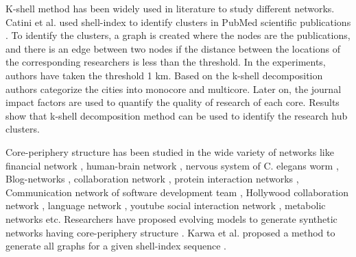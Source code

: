 \documentclass[12pt,3p]{article}
\begin{document}
 





K-shell method has been widely used in literature to study different networks. 
Catini et al. used shell-index to identify clusters in PubMed scientific publications \cite{catini2015identifying}. To identify the clusters, a graph is created where the nodes are the publications, and there is an edge between two nodes if the distance between the locations of the corresponding researchers is less than the threshold. In the experiments, authors have taken the threshold 1 km. Based on the k-shell decomposition authors categorize the cities into monocore and multicore. Later on, the journal impact factors are used to quantify the quality of research of each core. Results show that k-shell decomposition method can be used to identify the research hub clusters.

Core-periphery structure has been studied in the wide variety of networks like financial network \cite{fricke2015core, barucca2016disentangling}, human-brain network \cite{bassett2013task, park2013structural}, nervous system of C. elegans worm \cite{chatterjee2007understanding}, Blog-networks \cite{obradovic2009journey}, collaboration network \cite{leydesdorff2013international, hu2008visual}, protein interaction networks \cite{luo2009core}, Communication network of software development team \cite{crowston2006core, amrit2010exploring, setia2012peripheral, cataldo2008communication}, Hollywood collaboration network \cite{cattani2014insiders}, language network \cite{fedorenko2014reworking}, youtube social interaction network \cite{paolillo2008structure}, metabolic networks \cite{zhao2007modular} etc. Researchers have proposed evolving models to generate synthetic networks having core-periphery structure \cite{saxena2016evolving, adeniji2017generative}. Karwa et al. proposed a method to generate all graphs for a given shell-index sequence \cite{karwa2017statistical}.

\end{document}
